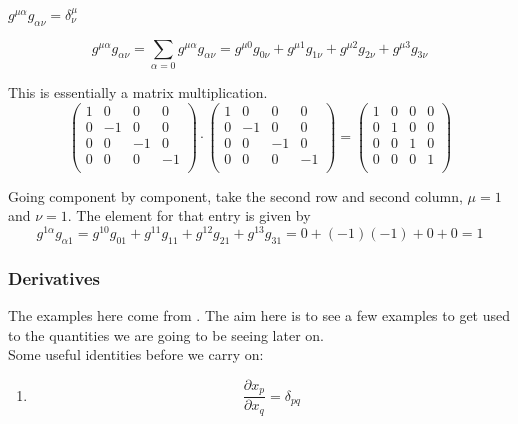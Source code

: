 $g^{\mu\alpha} g_{\alpha\nu} = \delta^{\mu}_{\nu}$

$$
g^{\mu\alpha} g_{\alpha\nu} = \sum_{\alpha = 0} g^{\mu\alpha} g_{\alpha\nu} =
g^{\mu 0} g_{0 \nu} + g^{\mu 1} g_{1\nu} + g^{\mu 2} g_{2\nu} + g^{\mu 3} g_{3\nu}
$$

This is essentially a matrix multiplication.
$$
\begin{pmatrix}
    1 & 0  & 0  & 0  \\
    0 & -1 & 0  & 0  \\
    0 & 0  & -1 & 0  \\
    0 & 0  & 0  & -1 \\
\end{pmatrix}
\cdot
\begin{pmatrix}
    1 & 0  & 0  & 0  \\
    0 & -1 & 0  & 0  \\
    0 & 0  & -1 & 0  \\
    0 & 0  & 0  & -1 \\
\end{pmatrix}
=
\begin{pmatrix}
    1 & 0 & 0 & 0 \\
    0 & 1 & 0 & 0 \\
    0 & 0 & 1 & 0 \\
    0 & 0 & 0 & 1 \\
\end{pmatrix}
$$

Going component by component, take the second row and second column, $\mu=1$ and $\nu=1$.
The element for that entry is given by
$$
g^{1\alpha}g_{\alpha 1} =
g^{1 0} g_{0 1} + g^{1 1} g_{1 1} + g^{1 2} g_{2 1} + g^{1 3} g_{3 1}
= 0 + (-1)(-1) + 0 + 0 = 1
$$


\subsubsection{Derivatives}

The examples here come from \cite{tensor-calc}.
The aim here is to see a few examples to get used to the quantities we are going to be seeing later on.
\\

Some useful identities before we carry on:
\begin{enumerate}
    \item
    $$
    \frac{\partial x_p}{\partial x_q} = \delta_{pq}
    $$
\end{enumerate}



